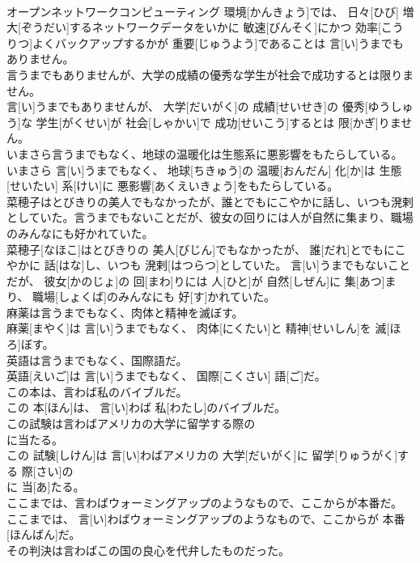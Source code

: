 \documentclass[8pt]{extreport}
\begin{document}
\begin{CJK}{UTF8}{min}
\\	オープンネットワークコンピューティング 環境[かんきょう]では、 日々[ひび] 増大[ぞうだい]するネットワークデータをいかに 敏速[びんそく]にかつ 効率[こうりつ]よくバックアップするかが 重要[じゅうよう]であることは 言[い]うまでもありません。
\\	言うまでもありませんが、大学の成績の優秀な学生が社会で成功するとは限りません。	
\\	言[い]うまでもありませんが、 大学[だいがく]の 成績[せいせき]の 優秀[ゆうしゅう]な 学生[がくせい]が 社会[しゃかい]で 成功[せいこう]するとは 限[かぎ]りません。
\\	いまさら言うまでもなく、地球の温暖化は生態系に悪影響をもたらしている。	
\\	いまさら 言[い]うまでもなく、 地球[ちきゅう]の 温暖[おんだん] 化[か]は 生態[せいたい] 系[けい]に 悪影響[あくえいきょう]をもたらしている。
\\	菜穂子はとびきりの美人でもなかったが、誰とでもにこやかに話し、いつも溌剌としていた。言うまでもないことだが、彼女の回りには人が自然に集まり、職場のみんなにも好かれていた。	
\\	菜穂子[なほこ]はとびきりの 美人[びじん]でもなかったが、 誰[だれ]とでもにこやかに 話[はな]し、いつも 溌剌[はつらつ]としていた。 言[い]うまでもないことだが、 彼女[かのじょ]の 回[まわ]りには 人[ひと]が 自然[しぜん]に 集[あつ]まり、 職場[しょくば]のみんなにも 好[す]かれていた。
\\	麻薬は言うまでもなく、肉体と精神を滅ぼす。	
\\	麻薬[まやく]は 言[い]うまでもなく、 肉体[にくたい]と 精神[せいしん]を 滅[ほろ]ぼす。
\\	英語は言うまでもなく、国際語だ。	
\\	英語[えいご]は 言[い]うまでもなく、 国際[こくさい] 語[ご]だ。
\\	この本は、言わば私のバイブルだ。	
\\	この 本[ほん]は、 言[い]わば 私[わたし]のバイブルだ。
\\	この試験は言わばアメリカの大学に留学する際の
\\	に当たる。	
\\	この 試験[しけん]は 言[い]わばアメリカの 大学[だいがく]に 留学[りゅうがく]する 際[さい]の 
\\	に 当[あ]たる。
\\	ここまでは、言わばウォーミングアップのようなもので、ここからが本番だ。	
\\	ここまでは、 言[い]わばウォーミングアップのようなもので、ここからが 本番[ほんばん]だ。
\\	その判決は言わばこの国の良心を代弁したものだった。	

\end{CJK}
\end{document}
